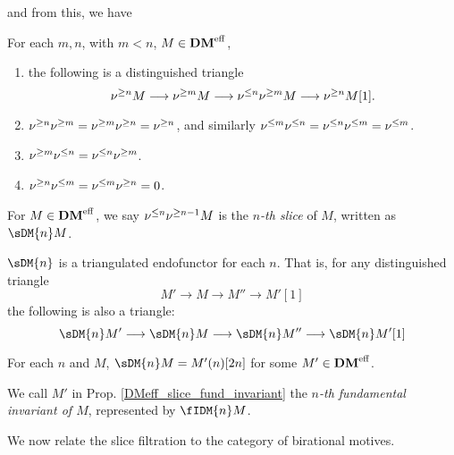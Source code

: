 and from this, we have

\begin{prop}
For each $m, n$, with $m < n$, $M \in \mathbf{DM}^{\mathrm{eff}}$,

\begin{enumerate}
\item the following is a distinguished triangle
\begin{equation}
\nu^{\geq n}M \longrightarrow \nu^{\geq m}M \longrightarrow \nu^{\leq n}\nu^{\geq m}M \longrightarrow \nu^{\geq n}M[1].
\end{equation}

\item $\nu^{\geq n}\nu^{\geq m} = \nu^{\geq m}\nu^{\geq n} = \nu^{\geq n}$, and 
similarly $\nu^{\leq m}\nu^{\leq n} = \nu^{\leq n}\nu^{\leq m} = \nu^{\leq m}$.

\item $\nu^{\geq m}\nu^{\leq n} = \nu^{\leq n}\nu^{\geq m}$.

\item $\nu^{\geq n}\nu^{\leq m} = \nu^{\leq m}\nu^{\geq n} = 0$.
\end{enumerate}
\end{prop}

\begin{definition}
For $M \in \mathbf{DM}^{\mathrm{eff}}$, we say $\nu^{\leq n}\nu^{\geq n - 1}M$ is the 
\emph{$n$-th slice} of $M$, written as $\sDM{n}M$.
\end{definition}

\begin{prop}
$\sDM{n}$ is a triangulated endofunctor for each $n$. That is,
for any distinguished triangle
\[
M' \to M \to M'' \to M'[1]
\]
the following is also a triangle:
\[
\sDM{n}M' \to \sDM{n}M \to \sDM{n}M'' \to \sDM{n}M'[1]
\]
\end{prop}

\begin{prop}\label{DMeff_slice_fund_invariant}
For each $n$ and $M$, $\sDM{n}M = M'(n)[2n]$ for some $M' \in
\mathbf{DM}^{\mathrm{eff}}$.
\end{prop}

\begin{definition}
We call $M'$ in Prop. \ref{DMeff_slice_fund_invariant} the 
\emph{$n$-th fundamental invariant of $M$}, represented by
$\fIDM{n}M$.
\end{definition}

We now relate the slice filtration to the category of birational
motives.


